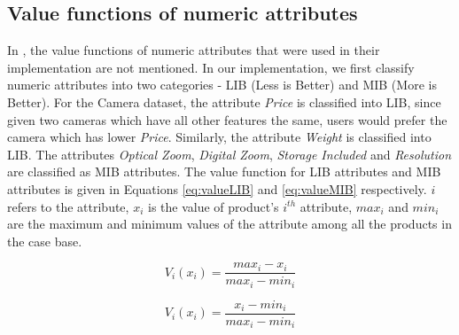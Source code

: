 \subsection{Value functions of numeric attributes}
In \cite{mautPaper}, the value functions of numeric attributes that were used in their implementation are not mentioned.
In our implementation, we first classify numeric attributes into two categories - LIB (Less is Better) and MIB (More is Better).
For the Camera dataset, the attribute \textit{Price} is classified into LIB, since given two cameras which have all other features the same, users would prefer the camera which has lower \textit{Price}.
Similarly, the attribute \textit{Weight} is classified into LIB.
The attributes \textit{Optical Zoom}, \textit{Digital Zoom}, \textit{Storage Included} and \textit{Resolution} are classified as MIB attributes.
The value function for LIB attributes and MIB attributes is given in Equations \ref{eq:valueLIB} and \ref{eq:valueMIB} respectively. $i$ refers to the attribute, $x_i$ is the value of product's $i^{th}$ attribute, $max_i$ and $min_i$ are the maximum and minimum values of the attribute among all the products in the case base.

\begin{equation}
\label{eq:valueLIB}
V_i(x_i) =  \frac{max_i - x_i}{max_i - min_i}
\end{equation}

\begin{equation}
\label{eq:valueMIB}
V_i(x_i) =  \frac{x_i-min_i}{max_i - min_i}
\end{equation}


